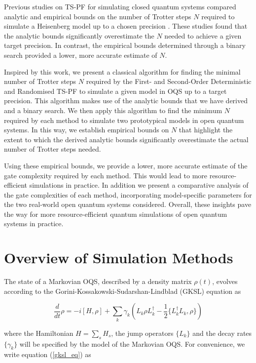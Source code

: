 \documentclass[pdflatex,sn-mathphys-num]{sn-jnl}%
\begin{document}
Previous studies on TS-PF for simulating closed quantum systems compared analytic and empirical bounds on the number of Trotter steps $N$ required to simulate a Heisenberg model up to a chosen precision \cite{childs2018toward,childs2019faster}. These studies found that the analytic bounds significantly overestimate the $N$ needed to achieve a given target precision. In contrast, the empirical bounds determined through a binary search provided a lower, more accurate estimate of $N$. 

Inspired by this work, we present a classical algorithm for finding the minimal number of Trotter steps $N$ required by the First- and Second-Order Deterministic and Randomised TS-PF to simulate a given model in OQS up to a target precision. This algorithm makes use of the analytic bounds that we have derived and a binary search. 
We then apply this algorithm to find the minimum $N$ required by each method to simulate two prototypical models in open quantum systems. In this way, we establish empirical bounds on $N$ that highlight the extent to which the derived analytic bounds significantly overestimate the actual number of Trotter steps needed.

Using these empirical bounds, we provide a lower, more accurate estimate of the gate complexity required by each method. This would lead to more resource-efficient simulations in practice. In addition we present a comparative analysis of the gate complexities of each method, incorporating model-specific parameters for the two real-world open quantum systems considered. Overall, these insights pave the way for more resource-efficient quantum simulations of open quantum systems in practice. 


\section{Overview of Simulation Methods}\label{sec2}
The state of a Markovian OQS, described by a density matrix $\rho(t)$, evolves according to the Gorini-Kossakowski-Sudarshan-Lindblad (GKSL) equation as \cite{gorini1976completely,lindblad1976generators}

\begin{equation}
    \frac{d}{dt} \rho =  -i[H,\rho] + \sum_{k}\gamma_k(L_k \rho L_k^\dagger - \frac{1}{2}\{L_k^\dagger L_k,\rho\})
\label{gksl_eq}
\end{equation}


\noindent where the Hamiltonian $H=\sum_{s}H_{s}$, the jump operators $\{L_k\}$  and the decay rates $\{\gamma_k\}$ will be specified by the model of the Markovian OQS. For convenience, we  write equation (\ref{gksl_eq}) as  
\end{document}
